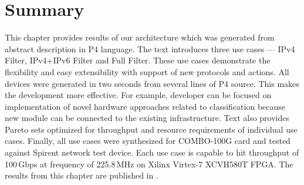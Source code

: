 \section{Summary}
This chapter provides results of our architecture which was generated from abstract description in P4 language. 
The text introduces three use cases --- IPv4 Filter, IPv4+IPv6 Filter and Full Filter. 
These use cases demonstrate the flexibility and easy extensibility with support of new protocols and actions. 
All devices were generated in two seconds from
several lines of P4 source. This makes the development more effective. For example, developer can be focused on implementation of novel
hardware approaches related to classification because new module can be connected to the existing infrastructure. 
Text also provides Pareto sets optimized for throughput and resource requirements of individual use cases. 
Finally, all use cases were synthesized for COMBO-100G card and tested against Spirent network test device. 
Each use case is capable to hit throughput of 100\,Gbps at frequency of 225.8\,MHz on Xilinx Virtex-7 XCVH580T FPGA.
The results from this chapter are published in \cite{2016h2rc-p4,2016MicproP4}.